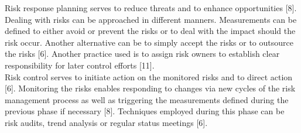 Risk response planning serves to reduce threats and to enhance opportunities [8]. Dealing with risks can be approached in different manners. Measurements can be defined to either avoid or prevent the risks or to deal with the impact should the risk occur. Another alternative can be to simply accept the risks or to outsource the risks [6]. Another practice used is to assign risk owners to establish clear responsibility for later control efforts [11].\\

Risk control serves to initiate action on the monitored risks and to direct action [6]. Monitoring the risks enables responding to changes via new cycles of the risk management process as well as triggering the measurements defined during the previous phase if necessary [8].  Techniques employed during this phase can be risk audits, trend analysis or regular status meetings [6]. 

